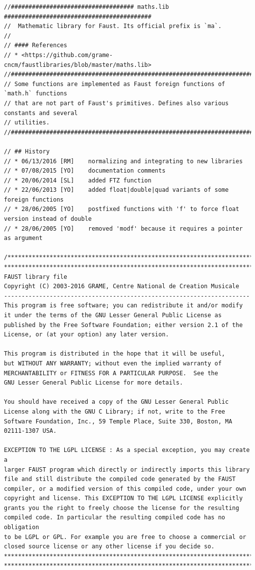 \documentclass{article}
\begin{document}
\bigskip\bigskip
\begin{lstlisting}[caption=\texttt{maths.lib}]
//################################### maths.lib ##########################################
//  Mathematic library for Faust. Its official prefix is `ma`.
//
// #### References
// * <https://github.com/grame-cncm/faustlibraries/blob/master/maths.lib>
//########################################################################################
// Some functions are implemented as Faust foreign functions of `math.h` functions
// that are not part of Faust's primitives. Defines also various constants and several
// utilities.
//########################################################################################

// ## History
// * 06/13/2016 [RM]	normalizing and integrating to new libraries
// * 07/08/2015	[YO]	documentation comments
// * 20/06/2014	[SL]	added FTZ function
// * 22/06/2013	[YO]	added float|double|quad variants of some foreign functions
// * 28/06/2005	[YO]	postfixed functions with 'f' to force float version instead of double
// * 28/06/2005	[YO]	removed 'modf' because it requires a pointer as argument

/************************************************************************
************************************************************************
FAUST library file
Copyright (C) 2003-2016 GRAME, Centre National de Creation Musicale
----------------------------------------------------------------------
This program is free software; you can redistribute it and/or modify
it under the terms of the GNU Lesser General Public License as
published by the Free Software Foundation; either version 2.1 of the
License, or (at your option) any later version.

This program is distributed in the hope that it will be useful,
but WITHOUT ANY WARRANTY; without even the implied warranty of
MERCHANTABILITY or FITNESS FOR A PARTICULAR PURPOSE.  See the
GNU Lesser General Public License for more details.

You should have received a copy of the GNU Lesser General Public
License along with the GNU C Library; if not, write to the Free
Software Foundation, Inc., 59 Temple Place, Suite 330, Boston, MA
02111-1307 USA.

EXCEPTION TO THE LGPL LICENSE : As a special exception, you may create a
larger FAUST program which directly or indirectly imports this library
file and still distribute the compiled code generated by the FAUST
compiler, or a modified version of this compiled code, under your own
copyright and license. This EXCEPTION TO THE LGPL LICENSE explicitly
grants you the right to freely choose the license for the resulting
compiled code. In particular the resulting compiled code has no obligation
to be LGPL or GPL. For example you are free to choose a commercial or
closed source license or any other license if you decide so.
************************************************************************
************************************************************************/


\end{lstlisting}
\end{document}
